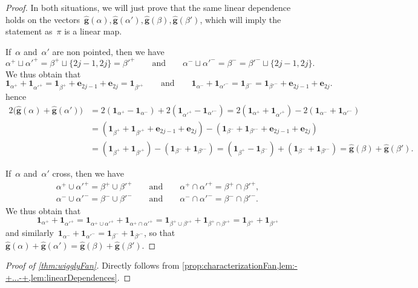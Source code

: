 \documentclass{amsart}
\theoremstyle{definition}
\renewcommand{\b}[1]{{\boldsymbol{#1}}} %
\newcommand{\one}{\b{1}} %
\begin{document}
\begin{proof}
In both situations, we will just prove that the same linear dependence holds on the vectors~$\hat{\b{g}}(\alpha), \hat{\b{g}}(\alpha'), \hat{\b{g}}(\beta), \hat{\b{g}}(\beta')$, which will imply the statement as~$\pi$ is a linear map.

If~$\alpha$ and~$\alpha'$ are non pointed, then we have
\[
\alpha^+ \sqcup \alpha'^+ = \beta^+ \sqcup \{2j-1, 2j\} = \beta'^+
\qquad\text{and}\qquad 
\alpha^- \sqcup \alpha'^- = \beta^- = \beta'^- \sqcup \{2j-1, 2j\}.
\]
We thus obtain that
\[
\one_{\alpha^+} + \one_{\alpha'^+} = \one_{\beta^+} + \b{e}_{2j-1} + \b{e}_{2j} = \one_{\beta'^+}
\qquad\text{and}\qquad 
\one_{\alpha^-} + \one_{\alpha'^-} = \one_{\beta^-} = \one_{\beta'^-} + \b{e}_{2j-1} + \b{e}_{2j}.
\]
hence
\begin{align*}
2 \big( \hat{\b{g}}(\alpha) + \hat{\b{g}}(\alpha') \big)
& = 2(\one_{\alpha^+} - \one_{\alpha^-}) + 2(\one_{\alpha'^+} - \one_{\alpha'^-})
= 2(\one_{\alpha^+} + \one_{\alpha'^+}) - 2(\one_{\alpha^-} + \one_{\alpha'^-}) \\
& = (\one_{\beta^+} + \one_{\beta'^+} + \b{e}_{2j-1} + \b{e}_{2j}) - (\one_{\beta^-} + \one_{\beta'^-} + \b{e}_{2j-1} + \b{e}_{2j}) \\
& = (\one_{\beta^+} + \one_{\beta'^+}) - (\one_{\beta^-} + \one_{\beta'^-})
= (\one_{\beta^+} - \one_{\beta^-}) + (\one_{\beta^-} + \one_{\beta'^-})
= \hat{\b{g}}(\beta) + \hat{\b{g}}(\beta').
\end{align*}

If~$\alpha$ and~$\alpha'$ cross, then we have
\begin{gather*}
\alpha^+ \cup \alpha'^+ = \beta^+ \cup \beta'^+ \qquad\text{and}\qquad \alpha^+ \cap \alpha'^+ = \beta^+ \cap \beta'^+, \\
\alpha^- \cup \alpha'^- = \beta^- \cup \beta'^- \qquad\text{and}\qquad \alpha^- \cap \alpha'^- = \beta^- \cap \beta'^-.
\end{gather*}
We thus obtain that
\[
\one_{\alpha^+} + \one_{\alpha'^+} = \one_{\alpha^+ \cup \alpha'^+} + \one_{\alpha^+ \cap \alpha'^+} = \one_{\beta^+ \cup \beta'^+} + \one_{\beta^+ \cap \beta'^+} = \one_{\beta^+} + \one_{\beta'^+}
\]
and similarly~$\one_{\alpha^-} + \one_{\alpha'^-} = \one_{\beta^-} + \one_{\beta'^-}$, so that~$\hat{\b{g}}(\alpha) + \hat{\b{g}}(\alpha') =\hat{\b{g}}(\beta) + \hat{\b{g}}(\beta')$.
\end{proof}

\begin{proof}[Proof of \cref{thm:wigglyFan}]
Directly follows from \cref{prop:characterizationFan,lem:-+...-+,lem:linearDependences}.
\end{proof}
\end{document}
